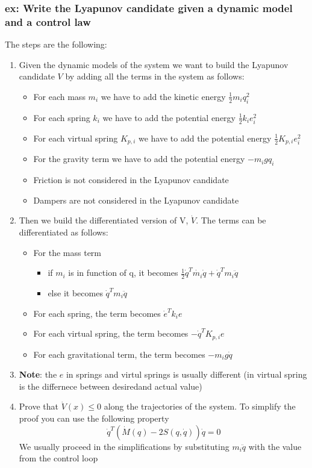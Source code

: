 \documentclass[a4paper,12pt]{article}
\begin{document}
\subsubsection{ex: Write the Lyapunov candidate given a dynamic model and a control law}
The steps are the following:
\begin{enumerate}
    \item Given the dynamic models of the system we want 
    to build the Lyapunov candidate $V$ by adding all the terms in the 
    system as follows:
    \begin{itemize} 
        \item For each mass $m_i$ we have to add the kinetic energy $\frac{1}{2}m_i q_i^2$
        \item For each spring $k_i$ we have to add the potential energy $\frac{1}{2}k_i e_i^2$
        \item For each virtual spring $K_{p,i}$ we have to add the potential energy $\frac{1}{2}K_{p,i} e_i^2$
        \item For the gravity term we have to add the potential energy $-m_i g q_i$
        \item Friction is not considered in the Lyapunov candidate
        \item Dampers are not considered in the Lyapunov candidate
    \end{itemize}
    \item Then we build the differentiated version of V, $\dot{V}$. The terms can be 
    differentiated as follows:
    \begin{itemize}
        \item For the mass term \begin{itemize}
            \item if $m_i$ is in function of q, it becomes $\frac{1}{2}\dot{q}^T\dot{m_i}\dot{q}+\dot{q}^Tm_i\ddot{q}$
            \item else it becomes $\dot{q}^Tm_i\ddot{q}$
        \end{itemize}
        \item For each spring, the term becomes $\dot{e}^Tk_ie$
        \item For each virtual spring, the term becomes $-\dot{q}^TK_{p,i}e$
        \item For each gravitational term, the term becomes $-m_i g \dot{q}$
    \end{itemize}
    \item \textbf{Note}: the $e$ in springs and virtul springs is usually different (in virtual spring
    is the differnece between desiredand actual value)
    \item Prove that $\dot{V}(x) \leq 0$ along the trajectories of the system. To simplify 
    the proof you can use the following property \begin{equation}
        \dot{q}^T(\dot{M}(q) - 2S(q,\dot{q}))\dot{q} = 0
    \end{equation} 
    We usually proceed in the simplifications by substituting $m_i \ddot{q}$ with
     the value from the control loop
     
\end{enumerate}
\end{document}
